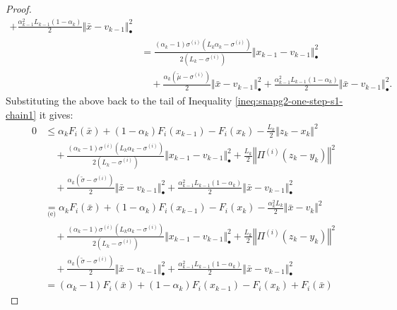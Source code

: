 \documentclass[12pt]{article}
\begin{document}
\begin{proof}
{\begin{align*}
                + \frac{\alpha_{k - 1}^2L_{k - 1}(1 - \alpha_k)}{2} \Vert \bar x - v_{k - 1}\Vert^2_\bullet
            \\
            &= \frac{(\alpha_k - 1)\sigma^{(i)}\left(L_k\alpha_k - \sigma^{(i)}\right)}{2\left(L_k - \sigma^{(i)}\right)}
                \Vert x_{k - 1} - v_{k - 1} \Vert^2_\bullet
                \\ &\quad 
                + \frac{\alpha_k(\tilde\mu - \sigma^{(i)})}{2} \Vert \bar x - v_{k - 1}\Vert^2_\bullet
                + \frac{\alpha_{k - 1}^2L_{k - 1}(1 - \alpha_k)}{2} \Vert \bar x - v_{k - 1}\Vert^2_\bullet.
        \end{align*}
        }
        Substituting the above back to the tail of Inequality \eqref{ineq:snapg2-one-step-s1-chain1} it gives: 
        {\allowdisplaybreaks
        \begin{align*}
            0 &\le 
            \alpha_k F_i(\bar x) + (1 - \alpha_k)F_i(x_{k - 1}) - F_i(x_k)     
            - \frac{L_k}{2}\Vert z_k - x_k\Vert^2 
                \\ &\quad 
                + \frac{(\alpha_k - 1)\sigma^{(i)}\left(L_k\alpha_k - \sigma^{(i)}\right)}{2\left(L_k - \sigma^{(i)}\right)}\Vert x_{k - 1} - v_{k - 1} \Vert^2_\bullet
                + \frac{L_k}{2}\left\Vert \Pi^{(i)}(z_k - y_k)\right\Vert^2
                \\ &\quad 
                + \frac{\alpha_k(\tilde\sigma - \sigma^{(i)})}{2} \Vert \bar x - v_{k - 1}\Vert^2_\bullet
                + \frac{\alpha_{k - 1}^2L_{k - 1}(1 - \alpha_k)}{2} \Vert \bar x - v_{k - 1}\Vert^2_\bullet
            \\
            &\underset{\text{(e)}}{=} 
            \alpha_k F_i(\bar x) + (1 - \alpha_k)F_i(x_{k - 1}) - F_i(x_k)     
            - \frac{\alpha_k^2L_k}{2}\Vert \bar x - v_k\Vert^2 
                \\ &\quad 
                + \frac{(\alpha_k - 1)\sigma^{(i)}\left(L_k\alpha_k - \sigma^{(i)}\right)}{2\left(L_k - \sigma^{(i)}\right)}\Vert x_{k - 1} - v_{k - 1} \Vert^2_\bullet
                + \frac{L_k}{2}\left\Vert \Pi^{(i)}(z_k - y_k)\right\Vert^2
                \\ &\quad 
                + \frac{\alpha_k(\tilde\sigma - \sigma^{(i)})}{2} \Vert \bar x - v_{k - 1}\Vert^2_\bullet
                + \frac{\alpha_{k - 1}^2L_{k - 1}(1 - \alpha_k)}{2} \Vert \bar x - v_{k - 1}\Vert^2_\bullet
            \\
            &= 
            (\alpha_k - 1) F_i(\bar x) + (1 - \alpha_k)F_i(x_{k - 1}) - F_i(x_k) + F_i(\bar x)

\end{align*}}
\end{proof}
\end{document}
